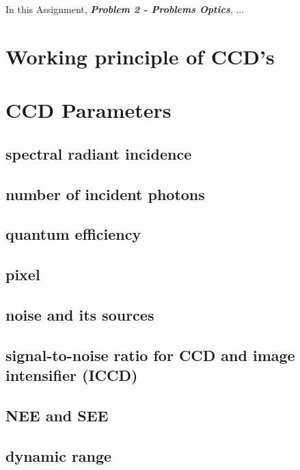 

In this Assignment, \textit{\textbf{Problem 2 - Problems Optics}}, ...


\section{Working principle of CCD's}



\section{CCD Parameters}

\subsection{spectral radiant incidence}

\subsection{number of incident photons}

\subsection{quantum efficiency}

\subsection{pixel}

\subsection{noise and its sources}

\subsection{signal-to-noise ratio for CCD and image intensifier (ICCD)}

\subsection{NEE and SEE}

\subsection{dynamic range}



